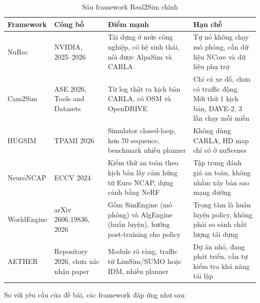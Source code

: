 \begin{table}[H]
  \centering
  \small
  \caption{Sáu framework Real2Sim chính}
  \begin{tabularx}{\linewidth}{>{\raggedright\arraybackslash}p{2.2cm} >{\raggedright\arraybackslash}p{2.1cm} >{\raggedright\arraybackslash}X >{\raggedright\arraybackslash}X}
    \toprule
    \textbf{Framework} & \textbf{Công bố} & \textbf{Điểm mạnh} & \textbf{Hạn chế} \\
    \midrule
    NuRec & NVIDIA, 2025--2026 & Tái dựng ở mức công nghiệp, có hệ sinh thái, nối được AlpaSim và CARLA & Tự nó không chạy mô phỏng, cần dữ liệu NCore và dữ liệu phụ trợ \\
    \addlinespace
    Cam2Sim & ASE 2026, Tools and Datasets & Từ log thật ra kịch bản CARLA, có OSM và OpenDRIVE & Chỉ có xe đỗ, chưa có traffic động. Mới thử 1 kịch bản, DAVE-2, 3 lần chạy mỗi miền \\
    \addlinespace
    HUGSIM & TPAMI 2026 & Simulator closed-loop, hơn 70 sequence, benchmark nhiều planner & Không dùng CARLA, HD map chỉ có ở nuScenes \\
    \addlinespace
    NeuroNCAP & ECCV 2024 & Kiểm thử an toàn theo kịch bản lấy cảm hứng từ Euro NCAP, dựng cảnh bằng NeRF & Tập trung đánh giá an toàn, không nhằm xây bản sao mạng đường \\
    \addlinespace
    WorldEngine & arXiv 2606.19836, 2026 & Gồm SimEngine (mô phỏng) và AlgEngine (huấn luyện), hướng post-training cho policy & Trọng tâm là huấn luyện policy, không phải so sánh chất lượng tái dựng \\
    \addlinespace
    AETHER & Repository 2026, chưa xác nhận paper & Module rõ ràng, traffic từ LimSim/SUMO hoặc IDM, nhiều planner & Dự án nhỏ, đang phát triển, cần tự kiểm tra khả năng tái lập \\
    \bottomrule
  \end{tabularx}
\end{table}

So với yêu cầu của đề bài, các framework đáp ứng như sau:


